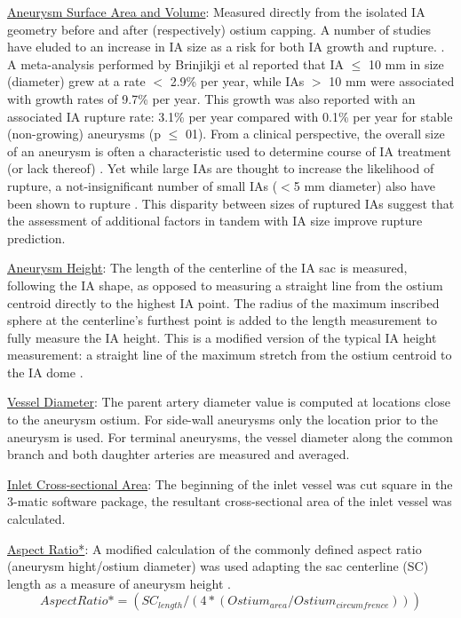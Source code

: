 \underline{Aneurysm Surface Area and Volume}: Measured directly from the isolated IA geometry before and after (respectively) ostium capping. A number of studies have eluded to an increase in IA size as a risk for both IA growth and rupture. \cite{varble2018stroke,brinjikji2015risk,Backes951,greving2014development}. A meta-analysis performed by Brinjikji et al reported that IA $\le$ 10 mm in size (diameter) grew at a rate $<$ 2.9\% per year, while IAs $>$ 10 mm were associated with growth rates of 9.7\% per year. This growth was also reported with an associated IA rupture rate: 3.1\% per year compared with 0.1\% per year for stable (non-growing) aneurysms (p $\le$ 01). From a clinical perspective, the overall size of an aneurysm is often a characteristic used to determine course of IA treatment (or lack thereof) \cite{williams2013management,komotar2008guidelines}. Yet while large IAs are thought to increase the likelihood of rupture, a not-insignificant number of small IAs ($<$5 mm diameter) also have been shown to rupture \cite{kashiwazaki2013size,forget2001review,Korja2014}. This disparity between sizes of ruptured IAs suggest that the assessment of additional factors in tandem with IA size improve rupture prediction. 

\underline{Aneurysm Height}: The length of the centerline of the IA sac is measured, following the IA shape, as opposed to measuring a straight line from the ostium centroid directly to the highest IA point. The radius of the maximum inscribed sphere at the centerline's furthest point is added to the length measurement to fully measure the IA height. This is a modified version of the typical IA height measurement: a straight line of the maximum stretch from the ostium centroid to the IA dome \cite{ma2010size,duan2018morphological}. 

\underline{Vessel Diameter}: The parent artery diameter value is computed at locations close to the aneurysm ostium. For side-wall aneurysms only the location prior to the aneurysm is used. For terminal aneurysms, the vessel diameter along the common branch and both daughter arteries are measured and averaged.

\underline{Inlet Cross-sectional Area}: The beginning of the inlet vessel was cut square in the 3-matic software package, the resultant cross-sectional area of the inlet vessel was calculated. 
 
\underline{Aspect Ratio*}: A modified calculation of the commonly defined aspect ratio (aneurysm hight/ostium diameter) was used adapting the sac centerline (SC) length as a measure of aneurysm height \cite{piccinelli2012characterization}.
\begin{equation}
Aspect Ratio* = (SC_{length} / (4*(Ostium_{area} / Ostium_{circumfrence})))
\end{equation}

